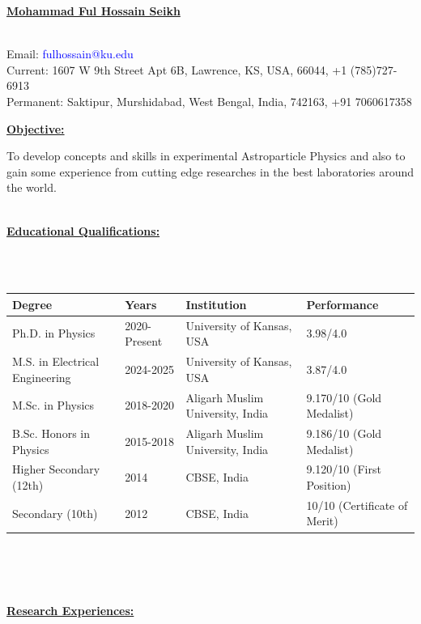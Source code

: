 \documentclass[10pt]{report}
\begin{document}

\begin{center}
\begin{Large}
\textbf{\href{https://physics.ku.edu/people/seikh-mohammad-ful-hossain}{Mohammad Ful Hossain Seikh}}
\end{Large}\\
Email: \textcolor{blue}{fulhossain@ku.edu}\\
Current: 1607 W 9th Street Apt 6B, Lawrence, KS, USA, 66044, +1 (785)727-6913\\
Permanent: Saktipur, Murshidabad, West Bengal, India, 742163, +91 7060617358\\
\hrulefill
\end{center}
\begin{large}\textbf{\underline{Objective:}}\end{large} To develop concepts and skills in experimental Astroparticle Physics and also to gain some experience from cutting edge researches in the best laboratories around the world.\\\\
\begin{large}
\textbf{\underline{Educational Qualifications:}}\end{large}\\\\
\begin{tabular}{| l | l | l | l |}
\hline
\textbf{Degree} & \textbf{Years} & \textbf{Institution} & \textbf{Performance} \\
\hline
Ph.D. in Physics & 2020-Present & University of Kansas, USA & 3.98/4.0 \\
M.S. in Electrical Engineering & 2024-2025 & University of Kansas, USA & 3.87/4.0 \\
M.Sc. in Physics & 2018-2020 & Aligarh Muslim University, India & 9.170/10 (Gold Medalist) \\
B.Sc. Honors in Physics & 2015-2018 & Aligarh Muslim University, India & 9.186/10 (Gold Medalist) \\
Higher Secondary (12th) & 2014 & CBSE, India & 9.120/10 (First Position) \\
Secondary (10th) & 2012 & CBSE, India & 10/10 (Certificate of Merit) \\
\hline
\end{tabular}\\\\\\\begin{large}
\textbf{\underline{Research Experiences:}}
\end{large}
\end{document}
